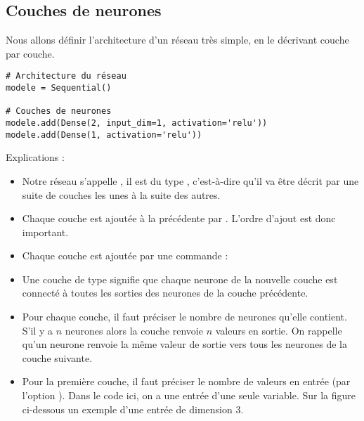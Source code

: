 \documentclass[11pt,class=report,crop=false]{standalone}
\begin{document}
\subsection{Couches de neurones}
\label{ssec:couches}

Nous allons définir l'architecture d'un réseau très simple, en le décrivant couche par couche.
\begin{lstlisting}
# Architecture du réseau
modele = Sequential()

# Couches de neurones
modele.add(Dense(2, input_dim=1, activation='relu'))
modele.add(Dense(1, activation='relu'))
\end{lstlisting} 

Explications :
\begin{itemize}
  \item Notre réseau s'appelle , il est du type , c'est-à-dire qu'il va être décrit par une suite de couches les unes à la suite des autres.
  
  \item Chaque couche est ajoutée à la précédente par .
  L'ordre d'ajout est donc important.
  
  \item Chaque couche est ajoutée par une commande :
  
  \item Une couche de type  signifie que chaque neurone de la nouvelle couche est connecté à toutes les sorties des neurones de la couche précédente.
  
 
  
  \item Pour chaque couche, il faut préciser le nombre de neurones qu'elle contient. S'il y a $n$ neurones alors la couche renvoie $n$ valeurs en sortie. On rappelle qu'un neurone renvoie la même valeur de sortie vers tous les neurones de la couche suivante.
  
  \item Pour la première couche, il faut préciser le nombre de valeurs en entrée (par l'option ). Dans le code ici, on a une entrée d'une seule variable. Sur la figure ci-dessous un exemple d'une entrée de dimension $3$.


\end{itemize}
\end{document}
